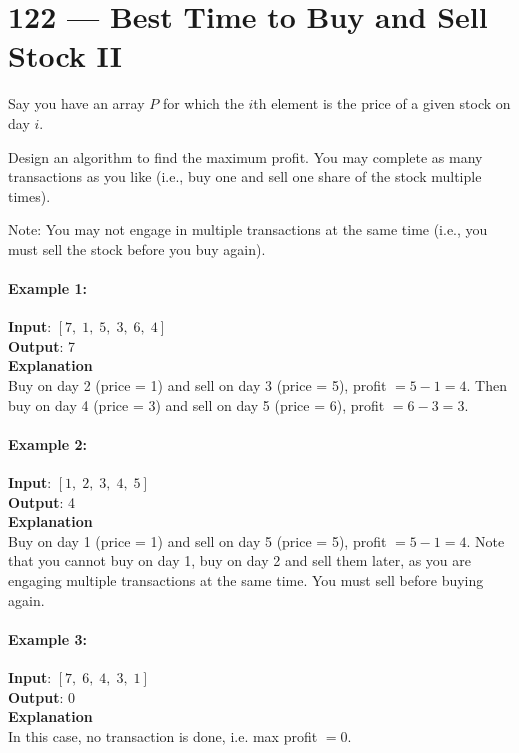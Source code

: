 \section{122 --- Best Time to Buy and Sell Stock II}
Say you have an array $P$ for which the $i$th element is the price of a given stock on day $i$.
\par
Design an algorithm to find the maximum profit. You may complete as many transactions as you like (i.e., buy one and sell one share of the stock multiple times).
\par
Note: You may not engage in multiple transactions at the same time (i.e., you must sell the stock before you buy again).
\paragraph{Example 1:}
\begin{flushleft}
\textbf{Input}: $[7,\;1,\;5,\;3,\;6,\;4]$
\\
\textbf{Output}: 7
\\
\textbf{Explanation}
\\
Buy on day 2 (price = 1) and sell on day 3 (price = 5), profit $= 5-1 = 4$. Then buy on day 4 (price = 3) and sell on day 5 (price = 6), profit $= 6-3 = 3$.
\end{flushleft}
\paragraph{Example 2:}
\begin{flushleft}
\textbf{Input}: $[1,\;2,\;3,\;4,\;5]$
\\
\textbf{Output}: 4
\\
\textbf{Explanation}
\\
Buy on day 1 (price = 1) and sell on day 5 (price = 5), profit $= 5-1 = 4$. Note that you cannot buy on day 1, buy on day 2 and sell them later, as you are engaging multiple transactions at the same time. You must sell before buying again.
\end{flushleft}
\paragraph{Example 3:}
\begin{flushleft}
\textbf{Input}: $[7,\;6,\;4,\;3,\;1]$
\\
\textbf{Output}: 0
\\
\textbf{Explanation}
\\
In this case, no transaction is done, i.e. max profit $= 0$.
\end{flushleft}
